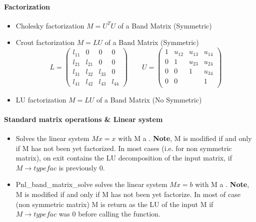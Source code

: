 \paragraph{Factorization}
\begin{itemize}
\item 
  \sshortdescribe Cholesky factorization $ M= U^T U$ of
  a Band Matrix (Symmetric)
\item  {}
  \sshortdescribe Crout factorization $
  M= L U$ of a Band Matrix (Symmetric)
  \begin{equation*}
    \label{eq:2}
    L=\begin{pmatrix}
      l_{11}&0&0&0\\ l_{21}&l_{21}&0&0\\
      l_{31}&l_{32}&l_{33}&0\\ l_{41}&l_{42}&l_{43}&l_{44}
    \end{pmatrix} \quad \quad
    U=\begin{pmatrix} 1&u_{12}&u_{13}&u_{14}\\
      0&1&u_{23}&u_{24}\\ 0&0&1&u_{34}\\ 0&0&&1\\
    \end{pmatrix}    
  \end{equation*}
\item  {}
  \sshortdescribe LU factorization $ M= L U$ of a Band
  Matrix (No Symmetric)
\end{itemize}

\paragraph{Standard matrix operations \& Linear system}
\begin{itemize}
\item 
  \sshortdescribe Solves the linear system $M x = x$ with M a .
  {\bf Note}, M is modified if and only if M has not been yet factorized.
  In most cases (i.e. for non symmetric matrix), on exit  contains the
  LU decomposition of the input matrix, 
  if $M\rightarrow typefac$ is previously $0$.   
\item  {} 
  \sshortdescribe Pnl_band_matrix_solve solves the
  linear system $ M x = b $ with M a .
  {\bf Note}, M is modified if and only if M has not been yet factorize.
  In most of case (non symmetric matrix) M is return as the LU of the input M
  if $M\rightarrow typefac$ was $0$ before calling the function. 
\end{itemize}

